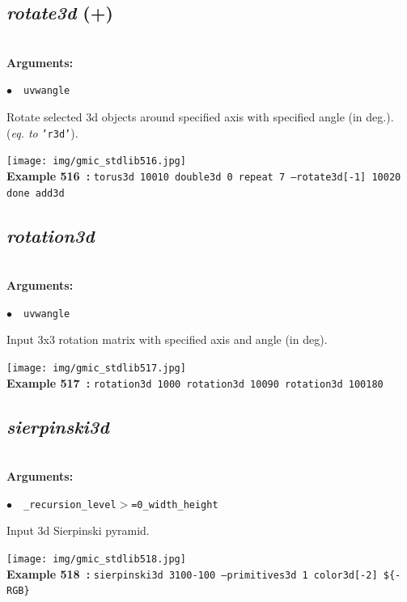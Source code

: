 \documentclass[a4paper,10.5pt,twoside]{book}
\def\comma{\discretionary{,}{}{,}}
\newcommand{\Cb}[1]{\textcolor{cb}{#1}}
\begin{document}
\subsection{\emph{rotate3d} (+)}\vspace*{-0.7em}
~\\\textbf{\Cb{Arguments: }}\begin{flushleft}
{\small \Cb{\hspace*{0.5cm}$\bullet$~~\texttt{u{\comma}v{\comma}w{\comma}angle}}}\end{flushleft}
Rotate selected 3d objects around specified axis with specified angle (in deg.).
~\\(\emph{eq. to} {\small \texttt{'r3d'}}).
\begin{center}\texttt{[image: img/gmic\_stdlib516.jpg]}\\
{\footnotesize \textbf{Example 516~:} \texttt{torus3d 100{\comma}10 double3d 0 repeat 7 --rotate3d[-1] 1{\comma}0{\comma}0{\comma}20 done add3d}}
\end{center}

\subsection{\emph{rotation3d} }\vspace*{-0.7em}
~\\\textbf{\Cb{Arguments: }}\begin{flushleft}
{\small \Cb{\hspace*{0.5cm}$\bullet$~~\texttt{u{\comma}v{\comma}w{\comma}angle}}}\end{flushleft}
Input 3x3 rotation matrix with specified axis and angle (in deg).
\begin{center}\texttt{[image: img/gmic\_stdlib517.jpg]}\\
{\footnotesize \textbf{Example 517~:} \texttt{rotation3d 1{\comma}0{\comma}0{\comma}0 rotation3d 1{\comma}0{\comma}0{\comma}90 rotation3d 1{\comma}0{\comma}0{\comma}180}}
\end{center}

\subsection{\emph{sierpinski3d} }\vspace*{-0.7em}
~\\\textbf{\Cb{Arguments: }}\begin{flushleft}
{\small \Cb{\hspace*{0.5cm}$\bullet$~~\texttt{\_recursion\_level$>$=0{\comma}\_width{\comma}\_height}}}\end{flushleft}
Input 3d Sierpinski pyramid.
\begin{center}\texttt{[image: img/gmic\_stdlib518.jpg]}\\
{\footnotesize \textbf{Example 518~:} \texttt{sierpinski3d 3{\comma}100{\comma}-100 --primitives3d 1 color3d[-2] \$\{-RGB\}}}
\end{center}
\end{document}
